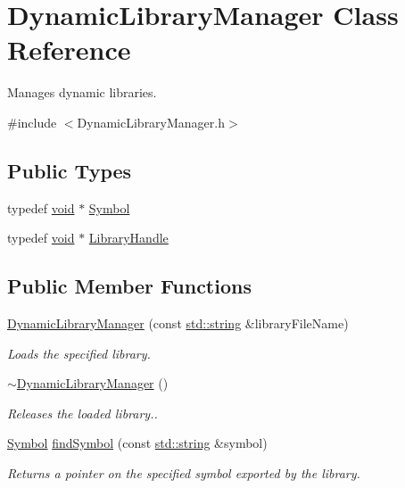 \hypertarget{class_dynamic_library_manager}{\section{Dynamic\-Library\-Manager Class Reference}
\label{class_dynamic_library_manager}
}


Manages dynamic libraries.  




{\ttfamily \#include $<$Dynamic\-Library\-Manager.\-h$>$}

\subsection*{Public Types}
\begin{DoxyCompactItemize}
\item 
typedef \hyperlink{wglew_8h_aeea6e3dfae3acf232096f57d2d57f084}{void} $\ast$ \hyperlink{class_dynamic_library_manager_abb1022f448f94bf40c890d38ea41c52b}{Symbol}
\item 
typedef \hyperlink{wglew_8h_aeea6e3dfae3acf232096f57d2d57f084}{void} $\ast$ \hyperlink{class_dynamic_library_manager_aa47563bb349a44ec41af6464300e0688}{Library\-Handle}
\end{DoxyCompactItemize}
\subsection*{Public Member Functions}
\begin{DoxyCompactItemize}
\item 
\hyperlink{class_dynamic_library_manager_a26d6592077763d9eb31d66d02d17b8d4}{Dynamic\-Library\-Manager} (const \hyperlink{glew_8h_ae84541b4f3d8e1ea24ec0f466a8c568b}{std\-::string} \&library\-File\-Name)
\begin{DoxyCompactList}\small\item\em Loads the specified library. \end{DoxyCompactList}\item 
\hyperlink{class_dynamic_library_manager_a1c6a30a61161a8ddb96279bfb44c44c7}{$\sim$\-Dynamic\-Library\-Manager} ()
\begin{DoxyCompactList}\small\item\em Releases the loaded library.. \end{DoxyCompactList}\item 
\hyperlink{class_dynamic_library_manager_abb1022f448f94bf40c890d38ea41c52b}{Symbol} \hyperlink{class_dynamic_library_manager_a2bd337473432b0f470f5bb987da77239}{find\-Symbol} (const \hyperlink{glew_8h_ae84541b4f3d8e1ea24ec0f466a8c568b}{std\-::string} \&symbol)
\begin{DoxyCompactList}\small\item\em Returns a pointer on the specified symbol exported by the library. \end{DoxyCompactList}\end{DoxyCompactItemize}


